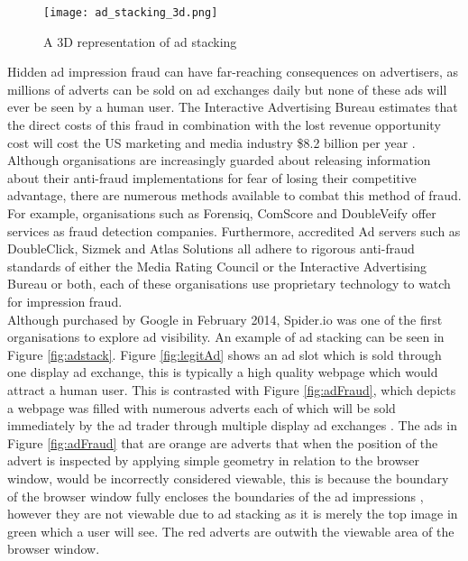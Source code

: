 \documentclass[12pt]{article}
\begin{document}
\begin{figure}[H]
    \centering
    \texttt{[image: ad\_stacking\_3d.png]}
    \caption{A 3D representation of ad stacking}
    \label{fig:ad_stacking_3d}
\end{figure}

Hidden ad impression fraud can have far-reaching consequences on advertisers, as millions of adverts can be sold on ad exchanges daily but none of these ads will ever be seen by a human user. The Interactive Advertising Bureau estimates that the direct costs of this fraud in combination with the lost revenue opportunity cost will cost the US marketing and media industry \$8.2 billion per year \parencite{iabfraud}. Although organisations are increasingly guarded about releasing information about their anti-fraud implementations for fear of losing their competitive advantage, there are numerous methods available to combat this method of fraud. For example, organisations such as Forensiq, ComScore and DoubleVeify offer services as fraud detection companies. Furthermore, accredited Ad servers such as DoubleClick, Sizmek and Atlas Solutions all adhere to rigorous anti-fraud standards of either the Media Rating Council or the Interactive Advertising Bureau or both, each of these organisations use proprietary technology to watch for impression fraud. \\

Although purchased by Google in February 2014, Spider.io was one of the first organisations to explore ad visibility. An example of ad stacking can be seen in Figure \ref{fig:adstack}. Figure \ref{fig:legitAd} shows an ad slot which is sold through one display ad exchange, this is typically a high quality webpage which would attract a human user. This is contrasted with Figure \ref{fig:adFraud}, which depicts a webpage was filled with numerous adverts each of which will be sold immediately by the ad trader through multiple display ad exchanges \parencite{spiderIo}. The ads in Figure \ref{fig:adFraud} that are orange are adverts that when the position of the advert is inspected by applying simple geometry in relation to the browser window, would be incorrectly considered viewable, this is because the boundary of the browser window fully encloses the boundaries of the ad impressions \parencite{spiderIo}, however they are not viewable due to ad stacking as it is merely the top image in green which a user will see. The red adverts are outwith the viewable area of the browser window.  \\ 
\end{document}
